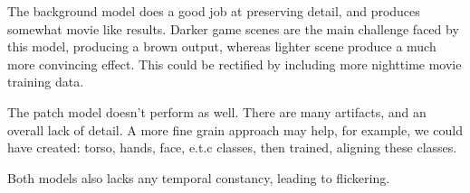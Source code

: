 The background model does a good job at preserving detail, and produces somewhat movie like results.
Darker game scenes are the main challenge faced by this model, producing a brown output, whereas lighter scene produce a much more convincing effect.
This could be rectified by including more nighttime movie training data.

The patch model doesn't perform as well.
There are many artifacts, and an overall lack of detail.
A more fine grain approach may help, for example, we could have created: torso, hands, face, e.t.c classes, then trained, aligning these classes.

Both models also lacks any temporal constancy, leading to flickering.
